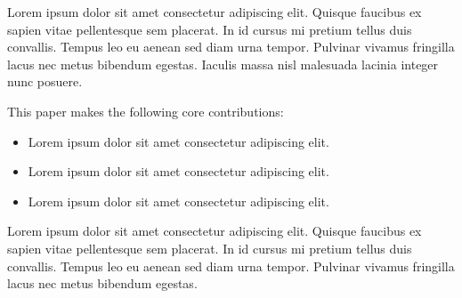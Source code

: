 \documentclass[sigconf,nonacm]{acmart} %
\begin{document}
Lorem ipsum dolor sit amet consectetur adipiscing elit. 
Quisque faucibus ex sapien vitae pellentesque sem placerat.
In id cursus mi pretium tellus duis convallis. 
Tempus leo eu aenean sed diam urna tempor.
Pulvinar vivamus fringilla lacus nec metus bibendum egestas. 
Iaculis massa nisl malesuada lacinia integer nunc posuere.

This paper makes the following core contributions:
\begin{itemize}[leftmargin=16pt, rightmargin=5pt, topsep=0pt]
    \item Lorem ipsum dolor sit amet consectetur adipiscing elit.
    \item Lorem ipsum dolor sit amet consectetur adipiscing elit.
    \item Lorem ipsum dolor sit amet consectetur adipiscing elit.
\end{itemize}

Lorem ipsum dolor sit amet consectetur adipiscing elit. 
Quisque faucibus ex sapien vitae pellentesque sem placerat.
In id cursus mi pretium tellus duis convallis. 
Tempus leo eu aenean sed diam urna tempor.
Pulvinar vivamus fringilla lacus nec metus bibendum egestas. 
\end{document}
